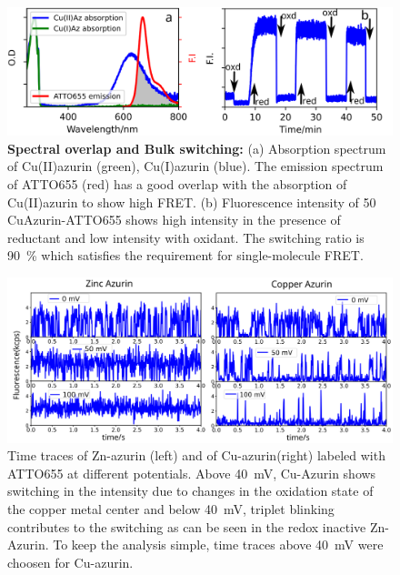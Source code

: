 \begin{figure}[ht]
  \centering
  \includegraphics[width=\textwidth]{spectral_overlap_switching}
  \makeatletter
  \renewcommand{\fnum@figure}{\figurename~S\thefigure}
  \makeatother
  \caption{ \textbf{Spectral overlap and Bulk switching:} (a) Absorption spectrum of Cu(II)azurin (green), Cu(I)azurin (blue).
  The emission spectrum of ATTO655 (red) has a good overlap with the absorption of Cu(II)azurin to show high FRET. 
  (b) Fluorescence intensity of \SI{50}{\nM} CuAzurin-ATTO655 shows high intensity in the presence of reductant and low 
  intensity with oxidant.
  The switching ratio is \SI{90}{\percent} which satisfies the requirement for single-molecule FRET.
  }
  \label{SIfig: switching}
\end{figure}
\begin{figure}[ht]
  \centering
  \includegraphics[width=\textwidth,keepaspectratio]{SI_timetrace_Zn_Cu}
  \makeatletter
  \renewcommand{\fnum@figure}{\figurename~S\thefigure}
  \makeatother
  \caption{Time traces of Zn-azurin (left) and of Cu-azurin(right) labeled with ATTO655 at different potentials. 
  Above \SI{40}{\mV}, Cu-Azurin shows switching in the intensity due to changes in the oxidation state of the copper metal center and below \SI{40}{\mV}, triplet blinking contributes to the switching as can be seen in the redox inactive Zn-Azurin.
  To keep the analysis simple, time traces above \SI{40}{\mV} were choosen for Cu-azurin.
  }
  \label{SIfig:tracecomparision}
\end{figure}
